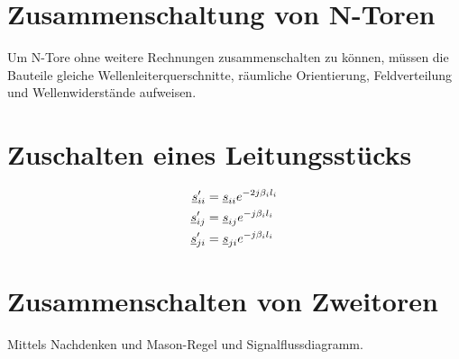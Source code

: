 \section{Zusammenschaltung von N-Toren}
Um N-Tore ohne weitere Rechnungen zusammenschalten zu können, müssen die Bauteile
gleiche Wellenleiterquerschnitte, räumliche Orientierung, Feldverteilung und
Wellenwiderstände aufweisen.

\section{Zuschalten eines Leitungsstücks}
\begin{align}
    \underline{s}_{ii}' &= \underline{s}_{ii} e^{-2j\beta_i l_i}\\
    \underline{s}_{ij}' &= \underline{s}_{ij} e^{-j\beta_i l_i}\\
    \underline{s}_{ji}' &= \underline{s}_{ji} e^{-j\beta_i l_i}
\end{align}

\section{Zusammenschalten von Zweitoren}
Mittels Nachdenken und Mason-Regel und Signalflussdiagramm.
